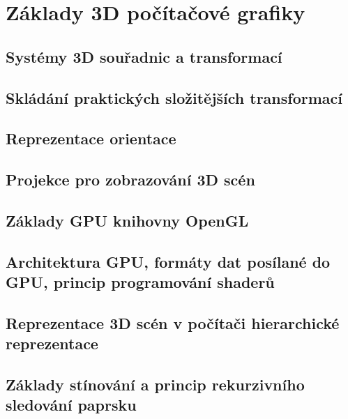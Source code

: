 \documentclass[../../main.tex]{subfiles}
\begin{document}
\section{Základy 3D počítačové grafiky}

\subsection{Systémy 3D souřadnic a transformací}
\subsection{Skládání praktických složitějších transformací}
\subsection{Reprezentace orientace}
\subsection{Projekce pro zobrazování 3D scén}
\subsection{Základy GPU knihovny OpenGL}
\subsection{Architektura GPU, formáty dat posílané do GPU, princip programování shaderů}
\subsection{Reprezentace 3D scén v počítači hierarchické reprezentace}
\subsection{Základy stínování a princip rekurzivního sledování paprsku}
\end{document}
